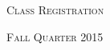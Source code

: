 \documentclass[landscape,letterpaper]{article}
\begin{document}
\pagestyle{empty} %

\noindent



\begin{center}
\textsc{\LARGE Class Registration}\\ %
\author{Baoxiang Pan}
\textsc{\large Fall Quarter 2015} %
\end{center}

\end{document}
